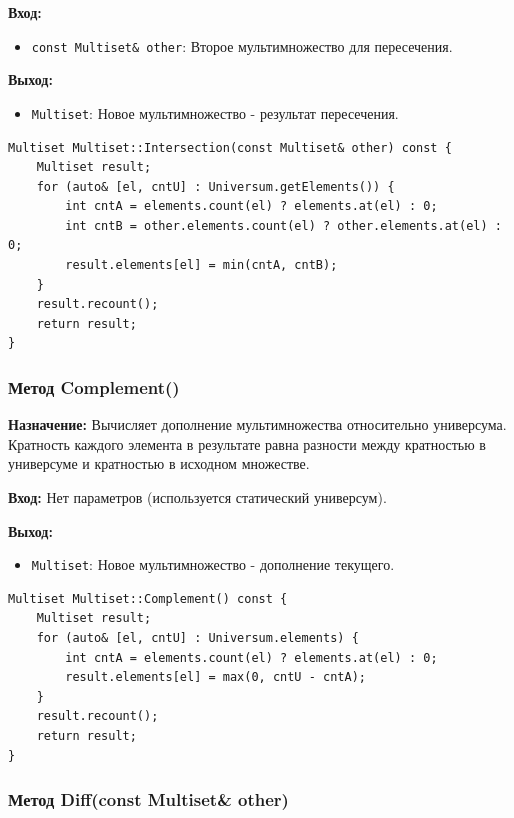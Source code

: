 \textbf{Вход:}
\begin{itemize}
    \item \texttt{const Multiset\& other}: Второе мультимножество для пересечения.
\end{itemize}

\textbf{Выход:}
\begin{itemize}
    \item \texttt{Multiset}: Новое мультимножество - результат пересечения.
\end{itemize}

\begin{lstlisting}[style=cstyle, caption={Реализация Intersection()}]
Multiset Multiset::Intersection(const Multiset& other) const {
    Multiset result;
    for (auto& [el, cntU] : Universum.getElements()) {
        int cntA = elements.count(el) ? elements.at(el) : 0;
        int cntB = other.elements.count(el) ? other.elements.at(el) : 0;
        result.elements[el] = min(cntA, cntB);
    }
    result.recount();
    return result;
}
\end{lstlisting}

\subsubsection{Метод Complement()}

\textbf{Назначение:} Вычисляет дополнение мультимножества относительно универсума. Кратность каждого элемента в результате равна разности между кратностью в универсуме и кратностью в исходном множестве.

\textbf{Вход:} Нет параметров (используется статический универсум).

\textbf{Выход:}
\begin{itemize}
    \item \texttt{Multiset}: Новое мультимножество - дополнение текущего.
\end{itemize}

\begin{lstlisting}[style=cstyle, caption={Реализация Complement()}]
Multiset Multiset::Complement() const {
    Multiset result;
    for (auto& [el, cntU] : Universum.elements) {
        int cntA = elements.count(el) ? elements.at(el) : 0;
        result.elements[el] = max(0, cntU - cntA);
    }
    result.recount();
    return result;
}
\end{lstlisting}

\subsubsection{Метод Diff(const Multiset\& other)}

